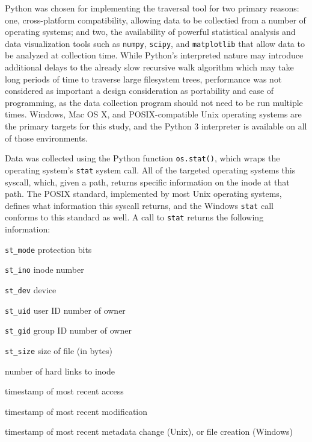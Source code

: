 \documentclass[12pt,a4paper]{article}
\begin{document}
				Python was chosen for implementing the traversal tool for two primary reasons: one, cross-platform compatibility, allowing data to be collectied from a number of operating systems; and two, the availability of powerful statistical analysis and data visualization tools such as \texttt{numpy}, \texttt{scipy}, and \texttt{matplotlib} that allow data to be analyzed at collection time. While Python's interpreted nature may introduce additional delays to the already slow recursive walk algorithm which may take long periods of time to traverse large filesystem trees, performance was not considered as important a design consideration as portability and ease of programming, as the data collection program should not need to be run multiple times. Windows, Mac OS X, and POSIX-compatible Unix operating systems are the primary targets for this study, and the Python 3 interpreter is available on all of those environments. 

				Data was collected using the Python function \texttt{os.stat()}, which wraps the operating system's \texttt{stat} system call. All of the targeted operating systems this syscall, which, given a path, returns specific information on the inode at that path. The POSIX standard, implemented by most Unix operating systems, defines what information this syscall returns, and the Windows \texttt{stat} call conforms to this standard as well. A call to \texttt{stat} returns the following information:

				\begin{description}[leftmargin=3cm, style=sameline]
					\begin{multicols}{2}
						\item[\texttt{st\_mode}]{protection bits}
						\item[\texttt{st\_ino}]{inode number}
						\item[\texttt{st\_dev}]{device}
						\item[\texttt{st\_uid}]{user ID number of owner}
						\item[\texttt{st\_gid}]{group ID number of owner}
						\item[\texttt{st\_size}]{size of file (in bytes)}
					\end{multicols}
					\item[\texttt{st\_nlink}]{number of hard links to inode}
					\item[\texttt{st\_atime}]{timestamp of most recent access}
					\item[\texttt{st\_mtime}]{timestamp of most recent modification}
					\item[\texttt{st\_ctime}]{timestamp of most recent metadata change (Unix), or file creation (Windows)}
				\end{description}
\end{document}
